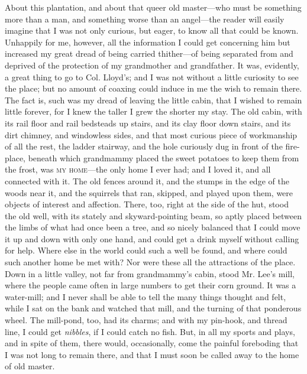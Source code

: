 About this plantation, and about that queer old master---who must be
something more than a man, {}and something worse than an angel---the
reader will easily imagine that I was not only curious, but eager, to
know all that could be known. Unhappily for me, however, all the
information I could get concerning him but increased my great dread of
being carried thither---of being separated from and deprived of the
protection of my grandmother and grandfather. It was, evidently, a great
thing to go to Col. Lloyd's; and I was not without a little curiosity to
see the place; but no amount of coaxing could induce in me the wish to
remain there. The fact is, such was my dread of leaving the little
cabin, that I wished to remain little forever, for I knew the taller I
grew the shorter my stay. The old cabin, with its rail floor and rail
bedsteads up stairs, and its clay floor down stairs, and its dirt
chimney, and windowless sides, and that most curious piece of
workmanship of all the rest, the ladder stairway, and the hole curiously
dug in front of the fire-place, beneath which grandmammy placed the
sweet potatoes to keep them from the frost, was \textsc{my home}---the
only home I ever had; and I loved it, and all connected with it. The old
fences around it, and the stumps in the edge of the woods near it, and
the squirrels that ran, skipped, and played upon them, were objects of
interest and affection. There, too, right at the side of the hut, stood
the old well, with its stately and skyward-pointing beam, so aptly
placed between the limbs of what had once been a tree, and so nicely
balanced that I could move it up and down with only one hand, and could
get a drink myself without calling for help. Where else in the world
could such a well be found, and where could {}such another home be met
with? Nor were these all the attractions of the place. Down in a little
valley, not far from grandmammy's cabin, stood Mr. Lee's mill, where the
people came often in large numbers to get their corn ground. It was a
water-mill; and I never shall be able to tell the many things thought
and felt, while I sat on the bank and watched that mill, and the turning
of that ponderous wheel. The mill-pond, too, had its charms; and with my
pin-hook, and thread line, I could get \emph{nibbles}, if I could catch
no fish. But, in all my sports and plays, and in spite of them, there
would, occasionally, come the painful foreboding that I was not long to
remain there, and that I must soon be called away to the home of old
master.

